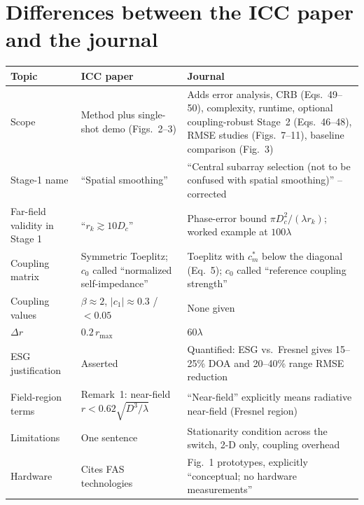 \documentclass[11pt,a4paper]{article}
\begin{document}
\section{Differences between the ICC paper and the journal}
\begin{longtable}{@{}p{3.6cm}p{5.6cm}p{6.4cm}@{}}
\toprule
Topic & ICC paper & Journal \\ \midrule \endhead
Scope & Method plus single-shot demo (Figs.~2--3) & Adds error analysis, CRB (Eqs.~49--50), complexity, runtime, optional coupling-robust Stage~2 (Eqs.~46--48), RMSE studies (Figs.~7--11), baseline comparison (Fig.~3) \\
Stage-1 name & ``Spatial smoothing'' & ``Central subarray selection (not to be confused with spatial smoothing)'' -- corrected \\
Far-field validity in Stage 1 & ``$r_k\gtrsim10D_c$'' & Phase-error bound $\pi D_c^2/(\lambda r_k)$; worked example at $100\lambda$ \\
Coupling matrix & Symmetric Toeplitz; $c_0$ called ``normalized self-impedance'' & Toeplitz with $c_m^*$ below the diagonal (Eq.~5); $c_0$ called ``reference coupling strength'' \\
Coupling values & $\beta\approx2$, $|c_1|\approx0.3$ / $<0.05$ & None given \\
$\Delta r$ & $0.2\,r_{\max}$ & $60\lambda$ \\
ESG justification & Asserted & Quantified: ESG vs.\ Fresnel gives 15--25\% DOA and 20--40\% range RMSE reduction \\
Field-region terms & Remark~1: near-field $r<0.62\sqrt{D^3/\lambda}$ & ``Near-field'' explicitly means radiative near-field (Fresnel region) \\
Limitations & One sentence & Stationarity condition across the switch, 2-D only, coupling overhead \\
Hardware & Cites FAS technologies & Fig.~1 prototypes, explicitly ``conceptual; no hardware measurements'' \\
\bottomrule
\end{longtable}

\end{document}
